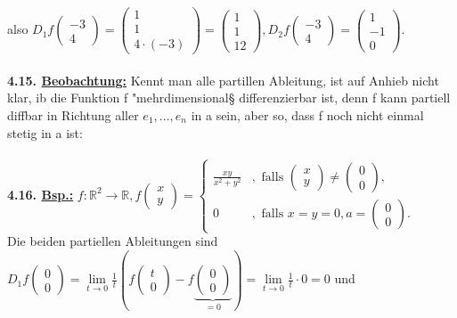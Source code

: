 \documentclass[]{scrartcl}
\begin{document}
also $D_1f\begin{pmatrix}
	-3\\4
\end{pmatrix}=\begin{pmatrix}
	1\\1\\4\cdot(-3)
\end{pmatrix}=\begin{pmatrix}
	1\\1\\12
\end{pmatrix}, D_2f\begin{pmatrix}
	-3\\4
\end{pmatrix}=\begin{pmatrix}
	1\\-1\\0
\end{pmatrix}.$\\
\\
\textbf{4.15. \underline{Beobachtung:}} Kennt man alle partillen Ableitung, ist 
auf Anhieb nicht klar, ib die Funktion f "mehrdimensional§ differenzierbar ist, 
denn f kann partiell diffbar in Richtung aller $e_1,...,e_n$ in a sein, aber 
so, dass f noch nicht einmal stetig in a ist:\\
\\
\textbf{4.16. \underline{Bsp.:}} $f:\mathbb{R}^2\rightarrow\mathbb{R}, 
f\begin{pmatrix}
	x\\y
\end{pmatrix}=\begin{cases}
	\frac{xy}{x^2+y^2}&, \text{ falls } \begin{pmatrix}
		x\\y
	\end{pmatrix}\neq\begin{pmatrix}
	0\\0
\end{pmatrix},\\
0 &, \text{ falls } x=y=0, a=\begin{pmatrix}
	0\\0
\end{pmatrix}.
\end{cases}$\\
Die beiden partiellen Ableitungen sind $D_1f\begin{pmatrix}
	0\\0
\end{pmatrix}=\lim\limits_{t\rightarrow0}\frac{1}{t}(f\begin{pmatrix}
	t\\0
\end{pmatrix}-f\underbrace{\begin{pmatrix}
	0\\0
\end{pmatrix}}_{=0})=\lim\limits_{t\rightarrow 0}\frac{1}{t}\cdot0=0$ und 
\end{document}
